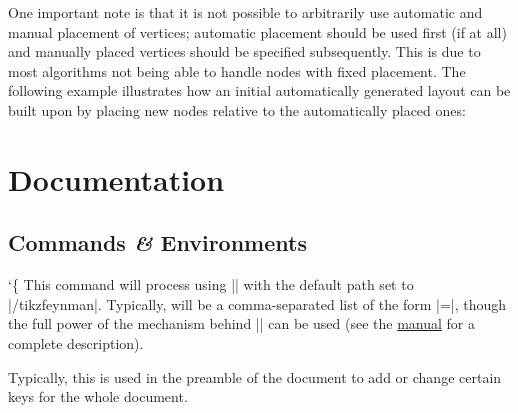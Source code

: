 \documentclass[a4paper,final]{ltxdoc}
\providecommand{\pgfmanual}{\href{http://mirrors.ctan.org/graphics/pgf/base/doc/pgfmanual.pdf}{\tikzname{} manual}}
\providecommand\marg[1]{%
  {\ttfamily\char`\{}\meta{#1}{\ttfamily\char`\}}}
\begin{document}
One important note is that it is not possible to arbitrarily use automatic and manual placement of vertices; automatic placement should be used first (if at all) and manually placed vertices should be specified subsequently.  This is due to most algorithms not being able to handle nodes with fixed placement.  The following example illustrates how an initial automatically generated layout can be built upon by placing new nodes relative to the automatically placed ones:

\begin{codeexample}[]
\end{codeexample}

\clearpage
\section{Documentation}
\label{sec:documentation}

\subsection{Commands \emph{\&} Environments}
\label{subsec:commands}

\begin{command}{\tikzfeynmanset\marg{options}}
  This command will process  using |\pgfkeys| with the default path set to |/tikzfeynman|.  Typically,  will be a comma-separated list of the form |=|, though the full power of the mechanism behind |\pgfkeys| can be used (see the \pgfmanual{} for a complete description).

  Typically, this is used in the preamble of the document to add or change certain keys for the whole document.
\end{command}
\end{document}
